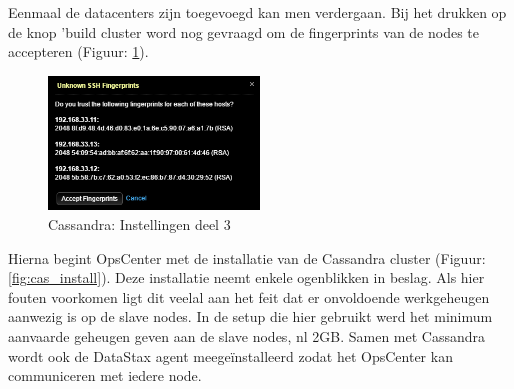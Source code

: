 Eenmaal de datacenters zijn toegevoegd kan men verdergaan.
Bij het drukken op de knop 'build cluster word nog gevraagd om de fingerprints van de nodes te accepteren (Figuur: \ref{fig:cas_conf_3}).

\begin{figure}[H]
  	\centering
    \includegraphics[width=0.5\textwidth]{img/4_1_installatie_cassandra/1_Configuration_part_3}
    \caption{Cassandra: Instellingen deel 3}
    \label{fig:cas_conf_3}
\end{figure}

Hierna begint OpsCenter met de installatie van de Cassandra cluster (Figuur: \ref{fig:cas_install}).
Deze installatie neemt enkele ogenblikken in beslag.
Als hier fouten voorkomen ligt dit veelal aan het feit dat er onvoldoende werkgeheugen aanwezig is op de slave nodes.
In de setup die hier gebruikt werd het minimum aanvaarde geheugen geven aan de slave nodes, nl 2GB.
Samen met Cassandra wordt ook de DataStax agent meegeïnstalleerd zodat het OpsCenter kan communiceren met iedere node.


